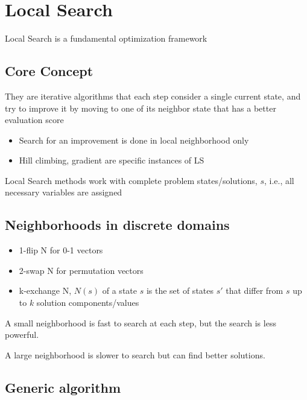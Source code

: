 \chapter*{Local Search}

Local Search is a fundamental optimization framework
\section*{Core Concept}

They are iterative algorithms that each step consider a single current state, and try to 
improve it by moving to one of its neighbor state that has a better evaluation 
score

\begin{itemize}
    \item Search for an improvement is done in local neighborhood only 
    \item Hill climbing, gradient are specific instances of LS
\end{itemize}

Local Search  methods work with complete problem
states/solutions, $s$, i.e., all necessary variables are assigned

\section*{Neighborhoods in discrete domains}

\begin{itemize}
    \item 1-flip N for 0-1 vectors
    \item 2-swap N for permutation vectors 
    \item k-exchange N, $N(s)$ of a state $s$ is the set of states $s'$ that differ
    from $s$ up to $k$ solution components/values
\end{itemize}

A small neighborhood is fast to search at each step, but the search is less powerful.

A large neighborhood is slower to search but can find better solutions.

\section*{Generic algorithm}

